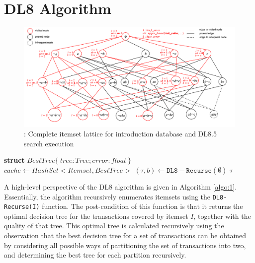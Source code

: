 \section{DL8 Algorithm}
\begin{figure}
	\includegraphics[width=\textwidth]{images/lattice_search}
	\caption{: Complete itemset lattice for introduction database and DL8.5 search execution}
	\label{fig:2}
\end{figure}

\begin{algorithm}
	\DontPrintSemicolon
	\caption{$DL8(maxdepth, minsup)$}
	\label{algo:1}
	\textbf{struct} $BestTree\{\ tree : Tree; error : float\ \}$\;
	$cache \gets HashSet < Itemset, BestTree >$\;
	$(\tau, b) \gets \mathrm{\mathtt{DL8-Recurse}}(\emptyset)$\;
	\Return $\tau$\;
\end{algorithm}

A high-level perspective of the DL8 algorithm is given in Algorithm \ref{algo:1}. Essentially, the algorithm recursively enumerates itemsets using the \verb|DL8-Recurse(I)| function. The post-condition of this function is that it returns the optimal decision tree for the transactions covered by itemset $I$, together with the quality of that tree. This optimal tree is calculated recursively using the observation that the best decision tree for a set of transactions can be obtained by considering all possible ways of partitioning the set of transactions into two, and determining the best tree for each partition recursively.

